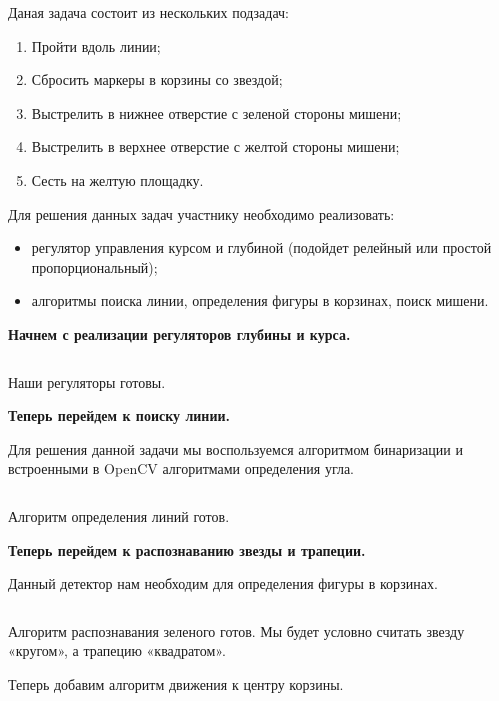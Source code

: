 \solutionSection

Даная задача состоит из нескольких подзадач:

\begin{enumerate}
    \item Пройти вдоль линии;
    \item Сбросить маркеры в корзины со звездой;
    \item Выстрелить в нижнее отверстие с зеленой стороны мишени;
    \item Выстрелить в верхнее отверстие с желтой стороны мишени;
    \item Сесть на желтую площадку.
\end{enumerate}

Для решения данных задач участнику необходимо реализовать:

\begin{itemize}
    \item регулятор управления курсом и глубиной (подойдет релейный или простой пропорциональный);
    \item алгоритмы поиска линии, определения фигуры в корзинах, поиск мишени.
\end{itemize}

\textbf{Начнем с реализации регуляторов глубины и курса.}

\inputminted[fontsize=\footnotesize, linenos]{cpp}{final/command_tour/vrs/task_02/source_1.cpp}

Наши регуляторы готовы. 

\textbf{Теперь перейдем к поиску линии.} 

Для решения данной задачи мы воспользуемся алгоритмом бинаризации и встроенными в OpenCV алгоритмами определения угла. 

\inputminted[fontsize=\footnotesize, linenos]{cpp}{final/command_tour/vrs/task_02/source_2.cpp}

Алгоритм определения линий готов. 

\textbf{Теперь перейдем к распознаванию звезды и трапеции.}

Данный детектор нам необходим для определения фигуры в корзинах. 

\inputminted[fontsize=\footnotesize, linenos]{cpp}{final/command_tour/vrs/task_02/source_3.cpp}

Алгоритм распознавания зеленого готов. Мы будет условно считать звезду «кругом», а трапецию «квадратом».  

Теперь добавим алгоритм движения к центру корзины. 


